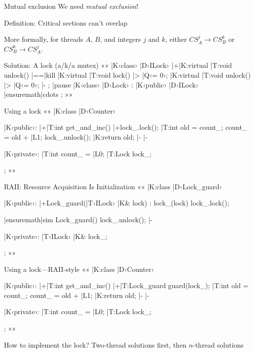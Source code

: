 \documentclass{beamer}
\begin{document}
\begin{frame}{Mutual exclusion}
  We need \emph{mutual exclusion}!

  \pause\medskip
  Definition: Critical sections can't overlap

  \medskip
  More formally, for threads $A$, $B$, and integers $j$ and $k$, either
  $CS_A^j \to CS_B^k$ or $CS_B^k \to CS_A^j$.
\end{frame}

\begin{frame}[fragile]{Solution: A lock (a/k/a mutex)}{}
  ««
  |K‹class› |D‹ILock›
  {
  	|+|K:virtual |T:void unlock() |==|kill%
    |K:virtual |T:void lock() |> |Q‹= 0›;
    |K:virtual |T:void unlock() |> |Q‹= 0›; |-
  };
  |pause
  |K‹class› |D‹Lock› : |K‹public› |D‹ILock› { |ensuremath|cdots };
  »»
\end{frame}

\begin{frame}[fragile]{Using a lock}{}
  ««
  |K:class |D‹Counter›
  {
  |K‹public›:
  	|+|T:int get_and_inc()
    {
    	|+lock_.lock();
      |T:int old = count_;
      count_ = old + |L1;
      lock_.unlock();
      |K:return old; |-
    } |-

  |K‹private›:
  	|T:int count_ = |L0;
  	|T:Lock lock_;
  };
  »»
\end{frame}

\begin{frame}[fragile]{RAII: Resource Acquisition Is Initialization}{}
  ««
  |K:class |D‹Lock_guard›
  {
  |K‹public›:
  	|+Lock_guard(|T‹ILock› |K& lock) : lock_(lock)
    {
    	lock_.lock();
    }

    |ensuremath|sim Lock_guard()
    {
    	lock_.unlock();
    } |-

  |K‹private›:
  	|T‹ILock› |K& lock_;
  };
  »»
\end{frame}

\begin{frame}[fragile]{Using a lock—RAII-style}{}
  ««
  |K:class |D‹Counter›
  {
  |K‹public›:
  	|+|T:int get_and_inc()
    {
    	|+|T:Lock_guard guard(lock_);
      |T:int old = count_;
      count_ = old + |L1;
      |K:return old; |-
    } |-

  |K‹private›:
  	|T:int count_ = |L0;
  	|T:Lock lock_;
  };
  »»
\end{frame}

\begin{frame}{How to implement the lock?}{}
  Two-thread solutions first, then $n$-thread solutions
\end{frame}
\end{document}

